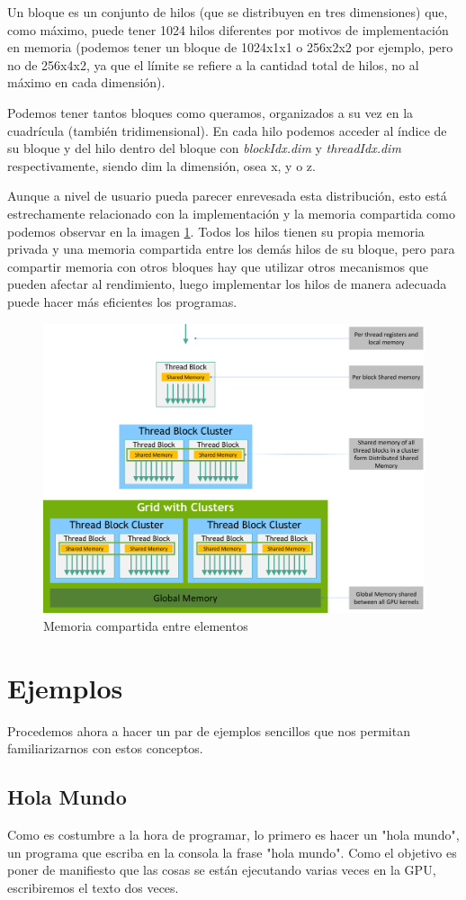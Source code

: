 Un bloque es un conjunto de hilos (que se distribuyen en tres dimensiones) que, como máximo, puede tener 1024 hilos diferentes por motivos de implementación en memoria (podemos tener un bloque de 1024x1x1 o 256x2x2 por ejemplo, pero no de 256x4x2, ya que el límite se refiere a la cantidad total de hilos, no al máximo en cada dimensión).

Podemos tener tantos bloques como queramos, organizados a su vez en la cuadrícula (también tridimensional). En cada hilo podemos acceder al índice de su bloque y del hilo dentro del bloque con \emph{blockIdx.dim} y \emph{threadIdx.dim} respectivamente, siendo dim la dimensión, osea x, y o z.

Aunque a nivel de usuario pueda parecer enrevesada esta distribución, esto está estrechamente relacionado con la implementación y la memoria compartida como podemos observar en la imagen \ref{fig:mem}. Todos los hilos tienen su propia memoria privada y una memoria compartida entre los demás hilos de su bloque, pero para compartir memoria con otros bloques hay que utilizar otros mecanismos que pueden afectar al rendimiento, luego implementar los hilos de manera adecuada puede hacer más eficientes los programas.

\begin{figure}
	\centering
	\includegraphics[width=0.7\linewidth]{Imagenes/Bitmap/memory}
	\caption{Memoria compartida entre elementos}
	\label{fig:mem}
\end{figure}


\section{Ejemplos}
Procedemos ahora a hacer un par de ejemplos sencillos que nos permitan familiarizarnos con estos conceptos.

\subsection{Hola Mundo}
Como es costumbre a la hora de programar, lo primero es hacer un "hola mundo", un programa que escriba en la consola la frase "hola mundo". Como el objetivo es poner de manifiesto que las cosas se están ejecutando varias veces en la \ac{GPU}, escribiremos el texto dos veces.

